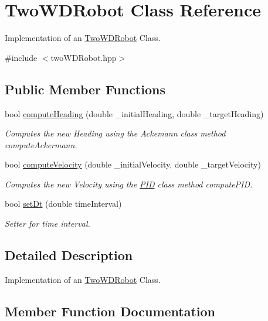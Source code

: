 \hypertarget{classTwoWDRobot}{}\section{Two\+W\+D\+Robot Class Reference}
\label{classTwoWDRobot}


Implementation of an \hyperlink{classTwoWDRobot}{Two\+W\+D\+Robot} Class.  




{\ttfamily \#include $<$two\+W\+D\+Robot.\+hpp$>$}

\subsection*{Public Member Functions}
\begin{DoxyCompactItemize}
\item 
bool \hyperlink{classTwoWDRobot_a03e69f6aefac0a8a692b1b0eafb70396}{compute\+Heading} (double \+\_\+initial\+Heading, double \+\_\+target\+Heading)
\begin{DoxyCompactList}\small\item\em Computes the new Heading using the Ackemann class method compute\+Ackermann. \end{DoxyCompactList}\item 
bool \hyperlink{classTwoWDRobot_afde5c9c504d2db26a05fd605f621b49b}{compute\+Velocity} (double \+\_\+initial\+Velocity, double \+\_\+target\+Velocity)
\begin{DoxyCompactList}\small\item\em Computes the new Velocity using the \hyperlink{classPID}{P\+ID} class method compute\+P\+ID. \end{DoxyCompactList}\item 
bool \hyperlink{classTwoWDRobot_a0112dd192de96966588226c55d84223d}{set\+Dt} (double time\+Interval)
\begin{DoxyCompactList}\small\item\em Setter for time interval. \end{DoxyCompactList}\end{DoxyCompactItemize}


\subsection{Detailed Description}
Implementation of an \hyperlink{classTwoWDRobot}{Two\+W\+D\+Robot} Class. 

\subsection{Member Function Documentation}
\mbox{\label{classTwoWDRobot_a03e69f6aefac0a8a692b1b0eafb70396}} 

